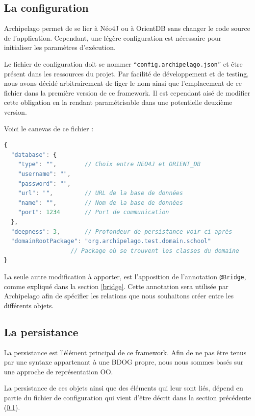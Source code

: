 \documentclass[a4paper,fleqn,12pt,oneside]{report}
\begin{document}
\subsection{La configuration}
\label{configuration}
Archipelago permet de se lier à Néo4J ou à OrientDB sans changer le code source de l'application. 
Cependant, une légère configuration est nécessaire pour initialiser les paramètres d'exécution.

Le fichier de configuration doit se nommer \enquote{\texttt{config.archipelago.json}} et être présent dans les ressources du projet. Par facilité de développement et de testing, nous avons décidé arbitrairement de figer le nom ainsi que l'emplacement de ce fichier dans la première version de ce framework. Il est cependant aisé de modifier cette obligation en la rendant paramétrisable dans une potentielle deuxième version.

Voici le canevas de ce fichier :

\begin{lstlisting}[language=JavaScript]
{
  "database": {
    "type": "",        // Choix entre NEO4J et ORIENT_DB
    "username": "",
    "password": "",
    "url": "",         // URL de la base de données
    "name": "",        // Nom de la base de données
    "port": 1234       // Port de communication
  },
  "deepness": 3,       // Profondeur de persistance voir ci-après
  "domainRootPackage": "org.archipelago.test.domain.school" 
                   // Package où se trouvent les classes du domaine 
}
\end{lstlisting}

La seule autre modification à apporter, est l'apposition de l'annotation \texttt{@Bridge}, comme expliqué dans la section \ref{bridge}. Cette annotation sera utilisée par Archipelago afin de spécifier les relations que nous souhaitons créer entre les différents objets.

\subsection{La persistance}


La persistance est l'élément principal de ce framework. Afin de ne pas être tenus par une syntaxe appartenant à une BDOG propre, nous nous sommes basés sur une approche de représentation OO. 

La persistance de ces objets ainsi que des éléments qui leur sont liés, dépend en partie du fichier de configuration qui vient d'être décrit dans la section précédente (\ref{configuration}). 
\end{document}
